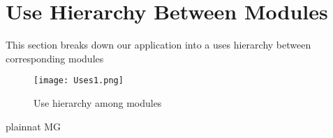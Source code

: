 \documentclass[12pt, titlepage]{article}
\begin{document}
\section{Use Hierarchy Between Modules} \label{SecUse}

This section breaks down our application into a uses hierarchy between corresponding modules 

\begin{figure}[H]
\centering
\texttt{[image: Uses1.png]}
\caption{Use hierarchy among modules}
\label{FigUH}
\end{figure}

 {plainnat}
 {MG}
\end{document}

